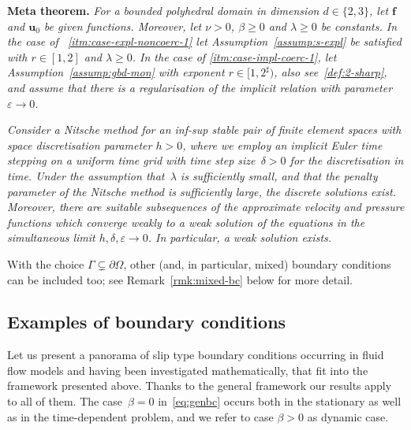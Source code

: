 \documentclass[reqno,a4paper]{amsart}
\def\vec#1{\boldsymbol{#1}}
\def\bf{\vec{f}}
\def\bu{\vec{u}}
\begin{document}
	\medskip 
	{\hfill
		\begin{minipage}{0.9\linewidth}
			\textbf{Meta theorem.}
			\emph{For a bounded polyhedral domain in dimension $d \in \{2,3\}$, let $\bf$ and $\bu_0$ be given functions. 
				Moreover, let $\nu>0$, $\beta \geq 0$ and $\lambda \geq 0$ be constants. 
				In the case of ~\eqref{itm:case-expl-noncoerc-1} let Assumption~\ref{assump:s-expl} be satisfied with $r \in [1,2]$ and $\lambda \geq 0$. 
				In the case of \eqref{itm:case-impl-coerc-1}, let Assumption~\ref{assump:gbd-mon} with exponent $r \in [1,2^\sharp)$, also see~\eqref{def:2-sharp}, and assume that there is a regularisation of the implicit relation with parameter $\varepsilon \to 0$.}
			
			\emph{Consider a Nitsche method for an inf-sup stable pair of finite element spaces with space discretisation parameter $h>0$, where we employ
				an implicit Euler time stepping on a uniform time grid with time step size~$\delta >0$ for the discretisation in time.
				Under the assumption that~$\lambda$ is sufficiently small, and that the penalty parameter of the Nitsche method is sufficiently large,  \emph{the discrete solutions exist}. Moreover, 
				there are suitable subsequences of the approximate velocity and pressure functions  \emph{which converge weakly to a weak solution of the equations in the simultaneous limit $h,\delta,  \varepsilon \to 0$. 
					In particular, a weak solution exists.}} 
		\end{minipage}  
		\hfill}
	\medskip 
	
	\medskip 
	With the choice $\Gamma \subsetneq \partial \Omega$, other (and, in particular, mixed) boundary conditions can be included too; see Remark~\ref{rmk:mixed-bc} below for more detail. 		
	
	\subsection{Examples of boundary conditions}\label{sec:model:ex}
	Let us present a panorama of slip type boundary conditions occurring in fluid flow models and having been investigated mathematically, that fit into the framework presented above.  
	Thanks to the general framework our results apply to all of them. 
	The case~$\beta = 0$ in~\eqref{eq:genbc} occurs both in the stationary as well as in the time-dependent problem, and we refer to case $\beta>0$ as dynamic case. 
	
\end{document}
